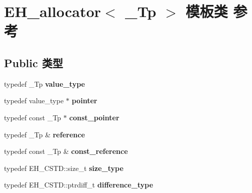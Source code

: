 \hypertarget{class_e_h__allocator}{}\section{E\+H\+\_\+allocator$<$ \+\_\+\+Tp $>$ 模板类 参考}
\label{class_e_h__allocator}
\subsection*{Public 类型}
\begin{DoxyCompactItemize}
\item 
\mbox{\label{class_e_h__allocator_aea9589af7c661642d0ffa2d14053ae31}} 
typedef \+\_\+\+Tp {\bfseries value\+\_\+type}
\item 
\mbox{\label{class_e_h__allocator_a756078f470ea0984b866cf495acb2851}} 
typedef value\+\_\+type $\ast$ {\bfseries pointer}
\item 
\mbox{\label{class_e_h__allocator_a351c52ebd9822c470c558a354c550684}} 
typedef const \+\_\+\+Tp $\ast$ {\bfseries const\+\_\+pointer}
\item 
\mbox{\label{class_e_h__allocator_aafb579221761474dfd4661a13fadf8b3}} 
typedef \+\_\+\+Tp \& {\bfseries reference}
\item 
\mbox{\label{class_e_h__allocator_a8713204c12f60e19f0551f77ec7ec4bd}} 
typedef const \+\_\+\+Tp \& {\bfseries const\+\_\+reference}
\item 
\mbox{\label{class_e_h__allocator_ac85328eeadb94ca49e44b4c6c0ff9d3e}} 
typedef E\+H\+\_\+\+C\+S\+T\+D\+::size\+\_\+t {\bfseries size\+\_\+type}
\item 
\mbox{\label{class_e_h__allocator_a02c10112a4087da5769cc5e5f4bf506f}} 
typedef E\+H\+\_\+\+C\+S\+T\+D\+::ptrdiff\+\_\+t {\bfseries difference\+\_\+type}
\end{DoxyCompactItemize}
